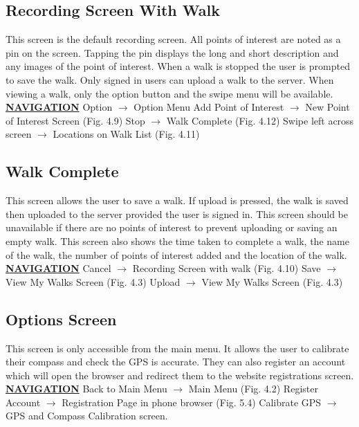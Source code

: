 \documentclass[12pt]{article}
\begin{document}
\subsection{Recording Screen With Walk}
\par{This screen is the default recording screen. All points of interest are noted as a pin on the
screen. Tapping the pin displays the long and short description and any images of the point
of interest. When a walk is stopped the user is prompted to save the walk. Only signed in
users can upload a walk to the server. When viewing a walk, only the option button and the
swipe menu will be available.} \newline
\textbf{\underline{NAVIGATION}} \newline
Option $\rightarrow$ Option Menu \newline
Add Point of Interest $\rightarrow$ New Point of Interest Screen (Fig. 4.9) \newline
Stop $\rightarrow$ Walk Complete (Fig. 4.12) \newline
Swipe left across screen $\rightarrow$ Locations on Walk List (Fig. 4.11) \newline
\subsection{Walk Complete}
This screen allows the user to save a walk. If upload is pressed, the walk is saved then uploaded
to the server provided the user is signed in. This screen should be unavailable if there are no
points of interest to prevent uploading or saving an empty walk. This screen also shows the time
taken to complete a walk, the name of the walk, the number of points of interest added and the
location of the walk. \newline
\textbf{\underline{NAVIGATION}} \newline
Cancel $\rightarrow$ Recording Screen with walk (Fig. 4.10) \newline
Save $\rightarrow$ View My Walks Screen (Fig. 4.3) \newline
Upload $\rightarrow$ View My Walks Screen (Fig. 4.3) \newline
\subsection{Options Screen}
\par{This screen is only accessible from the main menu. It allows the user to calibrate their compass
and check the GPS is accurate. They can also register an account which will open the browser
and redirect them to the website registrations screen.} \newline
\textbf{\underline{NAVIGATION}} \newline
Back to Main Menu $\rightarrow$ Main Menu (Fig. 4.2)\newline
Register Account $\rightarrow$  Registration Page in phone browser (Fig. 5.4) \newline
Calibrate GPS $\rightarrow$ GPS and Compass Calibration screen. \newline
\end{document}
